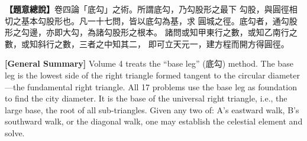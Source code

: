 \documentclass[9pt,a4paper]{article}
\begin{document}
\noindent\begin{minipage}[t]{0.48\textwidth}
\noindent
\textbf{【題意總說】}卷四論「底勾」之術。所謂底勾，乃勾股形之最下
勾股，與圓徑相切之基本勾股形也。凡一十七問，皆以底勾為基，求
圓城之徑。底勾者，通勾股形之勾邊，亦即大勾，為諸勾股形之根本。
諸問或知甲東行之數，或知乙南行之數，或知斜行之數，三者之中知其二，
即可立天元一，建方程而開方得圓徑。
\end{minipage}%
\hfill%
\begin{minipage}[t]{0.50\textwidth}
\noindent
\textbf{[General Summary]} Volume 4 treats the ``base leg'' (底勾) method.
The base leg is the lowest side of the right triangle formed tangent to
the circular diameter---the fundamental right triangle. All 17 problems
use the base leg as foundation to find the city diameter. It is the base
of the universal right triangle, i.e., the large base, the root of all
sub-triangles. Given any two of: A's eastward walk, B's southward walk,
or the diagonal walk, one may establish the celestial element and solve.
\end{minipage}
\vspace{0.15cm}

\vspace{0.2cm}
\end{document}
